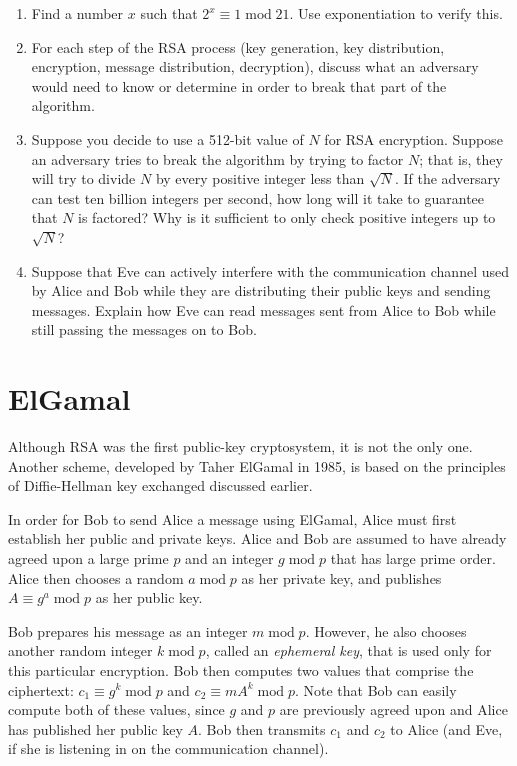 \documentclass{book}
\theoremstyle{plain}
\theoremstyle{definition}
\newif\ifprintsolutions
\newcommand{\solution}[1]{\ifprintsolutions \begin{sloppypar}{\it #1}\end{sloppypar} \fi} %
\renewcommand{\mod}{\operatorname{mod}}
\renewcommand{\mod}{\operatorname{mod}}
\begin{document}
\begin{enumerate}
\begin{enumerate}
\end{enumerate}
\item Find a number $x$ such that $2^x \equiv 1 \mod 21$. Use exponentiation to verify this. \solution{$2^{\phi(21)} \equiv 2^{12} \mod 21 \equiv 1 \mod 21$}
\item For each step of the RSA process (key generation, key distribution, encryption, message distribution, decryption), discuss what an adversary would need to know or determine in order to break that part of the algorithm.
\item Suppose you decide to use a 512-bit value of $N$ for RSA encryption. Suppose an adversary tries to break the algorithm by trying to factor $N$; that is, they will try to divide $N$ by every positive integer less than $\sqrt{N}$. If the adversary can test ten billion integers per second, how long will it take to guarantee that $N$ is factored? Why is it sufficient to only check positive integers up to $\sqrt{N}$? \solution{It will take about $\sqrt{2^{512}}/10000000000$ seconds, or about $2.7 \times 10^{49}$ times the age of the universe.}
\item Suppose that Eve can actively interfere with the communication channel used by Alice and Bob while they are distributing their public keys and sending messages. Explain how Eve can read messages sent from Alice to Bob while still passing the messages on to Bob.
\end{enumerate}

\chapter{ElGamal}
Although RSA was the first public-key cryptosystem, it is not the only one. Another scheme, developed by Taher ElGamal in 1985, is based on the principles of Diffie-Hellman key exchanged discussed earlier.

In order for Bob to send Alice a message using ElGamal, Alice must first establish her public and private keys. Alice and Bob are assumed to have already agreed upon a large prime $p$ and an integer $g \mod p$ that has large prime order. Alice then chooses a random $a \mod p$ as her private key, and publishes $A \equiv g^a \mod p$ as her public key.

Bob prepares his message as an integer $m \mod p$. However, he also chooses another random integer $k \mod p$, called an {\it ephemeral key}, that is used only for this particular encryption. Bob then computes two values that comprise the ciphertext: $c_1 \equiv g^k \mod p$ and $c_2 \equiv mA^k \mod p$. Note that Bob can easily compute both of these values, since $g$ and $p$ are previously agreed upon and Alice has published her public key $A$. Bob then transmits $c_1$ and $c_2$ to Alice (and Eve, if she is listening in on the communication channel).
\end{document}
